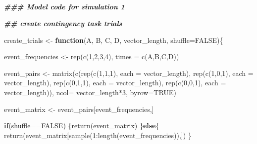 \documentclass[
  english,
  man,floatsintext]{apa6}
\newenvironment{Shaded}{\begin{snugshade}}{\end{snugshade}}
\newcommand{\DecValTok}[1]{\textcolor[rgb]{0.00,0.00,0.81}{#1}}
\newcommand{\ConstantTok}[1]{\textcolor[rgb]{0.00,0.00,0.00}{#1}}
\newcommand{\SpecialCharTok}[1]{\textcolor[rgb]{0.00,0.00,0.00}{#1}}
\newcommand{\DocumentationTok}[1]{\textcolor[rgb]{0.56,0.35,0.01}{\textbf{\textit{#1}}}}
\newcommand{\OtherTok}[1]{\textcolor[rgb]{0.56,0.35,0.01}{#1}}
\newcommand{\FunctionTok}[1]{\textcolor[rgb]{0.00,0.00,0.00}{#1}}
\newcommand{\ControlFlowTok}[1]{\textcolor[rgb]{0.13,0.29,0.53}{\textbf{#1}}}
\newcommand{\AttributeTok}[1]{\textcolor[rgb]{0.77,0.63,0.00}{#1}}
\newcommand{\NormalTok}[1]{#1}
\begin{document}
\endgroup


\clearpage
\makeatletter
\efloat@restorefloats
\makeatother


\begin{appendix}
\section{}
\singlespacing

\begin{Shaded}
\begin{Highlighting}[]
\DocumentationTok{\#\#\# Model code for simulation 1}

\DocumentationTok{\#\# create contingency task trials}

\NormalTok{create\_trials }\OtherTok{\textless{}{-}} \ControlFlowTok{function}\NormalTok{(A, B, C, D, vector\_length, }\AttributeTok{shuffle=}\ConstantTok{FALSE}\NormalTok{)\{}

\NormalTok{  event\_frequencies }\OtherTok{\textless{}{-}} \FunctionTok{rep}\NormalTok{(}\FunctionTok{c}\NormalTok{(}\DecValTok{1}\NormalTok{,}\DecValTok{2}\NormalTok{,}\DecValTok{3}\NormalTok{,}\DecValTok{4}\NormalTok{), }\AttributeTok{times =} \FunctionTok{c}\NormalTok{(A,B,C,D))}

\NormalTok{  event\_pairs }\OtherTok{\textless{}{-}} \FunctionTok{matrix}\NormalTok{(}\FunctionTok{c}\NormalTok{(}\FunctionTok{rep}\NormalTok{(}\FunctionTok{c}\NormalTok{(}\DecValTok{1}\NormalTok{,}\DecValTok{1}\NormalTok{,}\DecValTok{1}\NormalTok{), }\AttributeTok{each =}\NormalTok{ vector\_length),}
\FunctionTok{rep}\NormalTok{(}\FunctionTok{c}\NormalTok{(}\DecValTok{1}\NormalTok{,}\DecValTok{0}\NormalTok{,}\DecValTok{1}\NormalTok{), }\AttributeTok{each =}\NormalTok{ vector\_length),}
\FunctionTok{rep}\NormalTok{(}\FunctionTok{c}\NormalTok{(}\DecValTok{0}\NormalTok{,}\DecValTok{1}\NormalTok{,}\DecValTok{1}\NormalTok{), }\AttributeTok{each =}\NormalTok{ vector\_length),}
\FunctionTok{rep}\NormalTok{(}\FunctionTok{c}\NormalTok{(}\DecValTok{0}\NormalTok{,}\DecValTok{0}\NormalTok{,}\DecValTok{1}\NormalTok{), }\AttributeTok{each =}\NormalTok{ vector\_length)),}
\AttributeTok{ncol=}\NormalTok{ vector\_length}\SpecialCharTok{*}\DecValTok{3}\NormalTok{,}
\AttributeTok{byrow=}\ConstantTok{TRUE}\NormalTok{)}

\NormalTok{  event\_matrix }\OtherTok{\textless{}{-}}\NormalTok{ event\_pairs[event\_frequencies,]}

\ControlFlowTok{if}\NormalTok{(shuffle}\SpecialCharTok{==}\ConstantTok{FALSE}\NormalTok{) \{}\FunctionTok{return}\NormalTok{(event\_matrix)}
\NormalTok{    \}}\ControlFlowTok{else}\NormalTok{\{}
\FunctionTok{return}\NormalTok{(event\_matrix[}\FunctionTok{sample}\NormalTok{(}\DecValTok{1}\SpecialCharTok{:}\FunctionTok{length}\NormalTok{(event\_frequencies)),])}
\NormalTok{    \}}


\end{Highlighting}
\end{Shaded}
\end{appendix}
\end{document}
